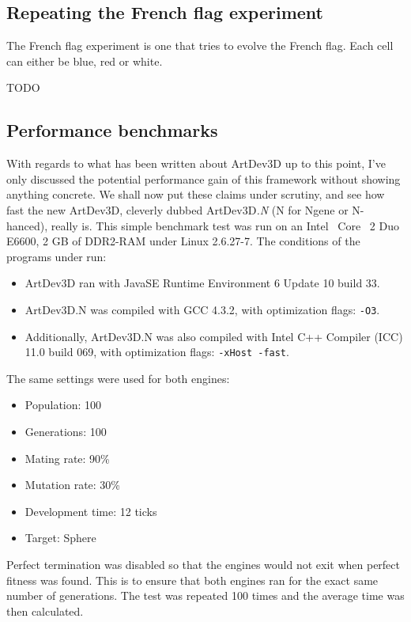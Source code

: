 \subsection{Repeating the French flag experiment}
The French flag experiment is one that tries to evolve the French flag. Each cell can either be blue, red or white.

TODO


\subsection{Performance benchmarks}
With regards to what has been written about ArtDev3D up to this point, I've only discussed the potential performance gain of this framework without showing anything concrete. We shall now put these claims under scrutiny, and see how fast the new ArtDev3D, cleverly dubbed ArtDev3D\emph{.N} (N for Ngene or N-hanced), really is. This simple benchmark test was run on an Intel\textregistered~ Core\texttrademark~ 2 Duo E6600, 2 GB of DDR2-RAM under Linux 2.6.27-7. The conditions of the programs under run:

\begin{itemize}
	\itemsep=0pt
	\item ArtDev3D ran with Java\texttrademark SE Runtime Environment 6 Update 10 build 33.
	\item ArtDev3D.N was compiled with GCC 4.3.2, with optimization flags: \texttt{-O3}.
	\item Additionally, ArtDev3D.N was also compiled with Intel C++ Compiler (ICC) 11.0 build 069, with optimization flags: \texttt{-xHost -fast}.
\end{itemize}

The same settings were used for both engines:

\begin{itemize}
	\itemsep=-2pt
	\item Population: 100
	\item Generations: 100
	\item Mating rate: 90\%
	\item Mutation rate: 30\%
	\item Development time: 12 ticks
	\item Target: Sphere
\end{itemize}

Perfect termination was disabled so that the engines would not exit when perfect fitness was found. This is to ensure that both engines ran for the exact same number of generations. The test was repeated 100 times and the average time was then calculated.

